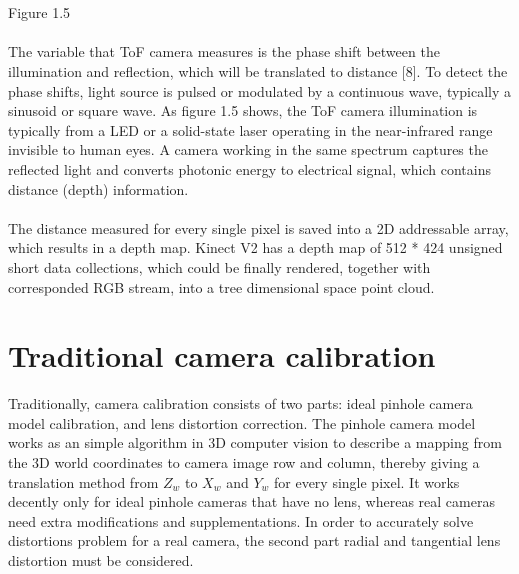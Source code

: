   \\\\Figure 1.5\\\\%
 The variable that ToF camera measures is the phase shift between the illumination and reflection, which will be translated to distance [8]. %
To detect the phase shifts, light source is pulsed or modulated by a continuous wave, typically a sinusoid or square wave.
As figure 1.5 shows, the ToF camera illumination is typically from a LED or a solid-state laser operating in the near-infrared range invisible to human eyes. A camera working in the same spectrum captures the reflected light and converts photonic energy to electrical signal, which contains distance (depth) information.
\\\\
The distance measured for every single pixel is saved into a 2D addressable array, which results in a depth map. Kinect V2 has a depth map of 512 * 424 unsigned short data collections, which could be finally rendered, together with corresponded RGB stream,  into a tree dimensional space point cloud.
\section{Traditional camera calibration} %
Traditionally, camera calibration consists of two parts: ideal pinhole camera model calibration, and lens distortion correction. The pinhole camera model works as an simple algorithm in 3D computer vision to describe a mapping from the 3D world coordinates to camera image row and column, thereby giving a translation method from \(Z_{w}\) to \(X_{w}\)  and \(Y_{w}\)  for every single pixel. It works decently only for ideal pinhole cameras that have no lens, whereas real cameras need extra modifications and supplementations. In order to accurately solve distortions problem for a real camera, the second part radial and tangential lens distortion must be considered.\\\par

